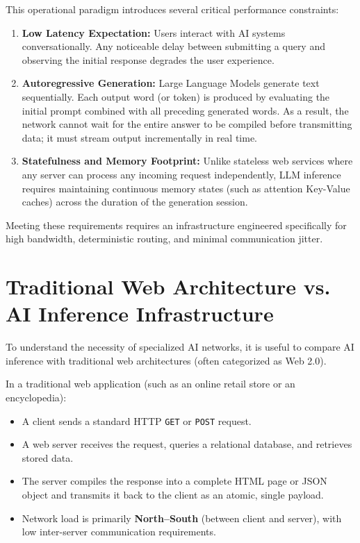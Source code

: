 \documentclass[12pt,a4paper]{report}
\begin{document}
This operational paradigm introduces several critical performance constraints:
\begin{enumerate}[leftmargin=1.2cm]
    \item \textbf{Low Latency Expectation:} Users interact with AI systems conversationally. Any noticeable delay between submitting a query and observing the initial response degrades the user experience.
    \item \textbf{Autoregressive Generation:} Large Language Models generate text sequentially. Each output word (or token) is produced by evaluating the initial prompt combined with all preceding generated words. As a result, the network cannot wait for the entire answer to be compiled before transmitting data; it must stream output incrementally in real time.
    \item \textbf{Statefulness and Memory Footprint:} Unlike stateless web services where any server can process any incoming request independently, LLM inference requires maintaining continuous memory states (such as attention Key-Value caches) across the duration of the generation session.
\end{enumerate}

Meeting these requirements requires an infrastructure engineered specifically for high bandwidth, deterministic routing, and minimal communication jitter.

\section{Traditional Web Architecture vs. AI Inference Infrastructure}
To understand the necessity of specialized AI networks, it is useful to compare AI inference with traditional web architectures (often categorized as Web 2.0).

In a traditional web application (such as an online retail store or an encyclopedia):
\begin{itemize}[leftmargin=1.2cm]
    \item A client sends a standard HTTP \texttt{GET} or \texttt{POST} request.
    \item A web server receives the request, queries a relational database, and retrieves stored data.
    \item The server compiles the response into a complete HTML page or JSON object and transmits it back to the client as an atomic, single payload.
    \item Network load is primarily \textbf{North--South} (between client and server), with low inter-server communication requirements.
\end{itemize}
\end{document}
